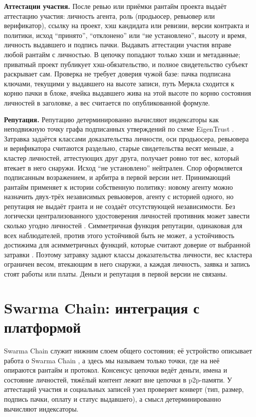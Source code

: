 \documentclass[10pt,a4paper]{article}
\begin{document}
\textbf{Аттестации участия.} После ревью или приёмки рантайм проекта выдаёт аттестацию участия: личность агента, роль (продьюсер, ревьювер или верификатор), ссылку на проект, хэш кандидата или ревизии, версии контракта и политики, исход ``принято'', ``отклонено'' или ``не установлено'', высоту и время, личность выдавшего и подпись пачки. Выдавать аттестации участия вправе любой рантайм с личностью. В цепочку попадают только хэши и метаданные; приватный проект публикует хэш-обязательство, и полное свидетельство субъект раскрывает сам. Проверка не требует доверия чужой базе: пачка подписана ключами, текущими у выдавшего на высоте записи, путь Меркла сходится к корню пачки в блоке, ячейка выдавшего жива на этой высоте по корню состояния личностей в заголовке, а вес считается по опубликованной формуле.

\textbf{Репутация.} Репутацию детерминированно вычисляют индексаторы как неподвижную точку графа подписанных утверждений по схеме EigenTrust \cite{eigentrust}. Затравка задаётся классами доказательства личности, оси продьюсера, ревьювера и верификатора считаются раздельно, старые свидетельства весят меньше, а кластер личностей, аттестующих друг друга, получает ровно тот вес, который втекает в него снаружи. Исход ``не установлено'' нейтрален. Спор оформляется подписанным возражением, и арбитра в первой версии нет. Принимающий рантайм применяет к истории собственную политику: новому агенту можно назначить двух-трёх независимых ревьюверов, агенту с историей одного, но репутация не выдаёт гранта и не создаёт отсутствующей независимости. Без логически централизованного удостоверения личностей противник может завести сколько угодно личностей \cite{sybil}. Симметричная функция репутации, одинаковая для всех наблюдателей, против этого устойчивой быть не может, а устойчивость достижима для асимметричных функций, которые считают доверие от выбранной затравки \cite{sybilproof}. Поэтому затравку задают классы доказательства личности, вес кластера ограничен весом, втекающим в него снаружи, а каждая личность, заявка и запись стоят работы или платы. Деньги и репутация в первой версии не связаны.

\section{Swarma Chain: интеграция с платформой}
\label{sec:chain}

Swarma Chain служит нижним слоем общего состояния; её устройство описывает работа о Swarma Chain \cite{swarmachain}, а здесь мы называем только точки, где на неё опираются рантайм и протокол. Консенсус цепочки ведёт деньги, имена и состояние личностей, тяжёлый контент лежит вне цепочки в p2p-памяти. У аттестаций участия и социальных записей узел проверяет конверт (тип, размер, подпись пачки, оплату и статус выдавшего), а смысл детерминированно вычисляют индексаторы.
\end{document}
